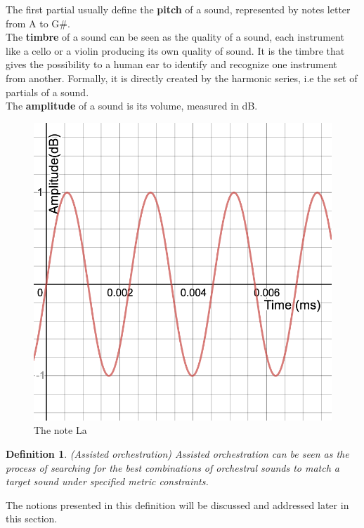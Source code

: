 \documentclass[a4paper]{book}
\newtheorem{definition}{Definition}
\begin{document}
The first partial usually define the \textbf{pitch} of a sound, represented by notes letter from A to G$\#$.\\

The \textbf{timbre} of a sound can be seen as the quality of a sound, each instrument like a cello or a violin producing its own quality of sound. It is the timbre that gives the possibility to a human ear to identify and recognize one instrument from another. Formally, it is directly created by the harmonic series, i.e the set of partials of a sound.\\

The \textbf{amplitude} of a sound is its volume, measured in dB.
\begin{figure}[h!]
\centering
\includegraphics[scale=0.3]{A440.png}
\caption{The note La}
\label{figassistedorch}
\end{figure}


\begin{definition}{\emph{(Assisted orchestration)}}
Assisted orchestration can be seen as the process of searching for the best combinations of orchestral sounds to match a target sound under specified metric constraints.
\end{definition}

The notions presented in this definition will be discussed and addressed later in this section.
\end{document}
